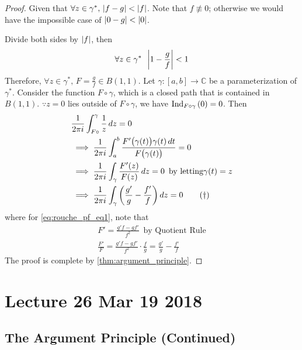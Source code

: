 \documentclass[notoc,notitlepage]{tufte-book}
\begin{document}
\begin{proof}
  Given that $\forall z \in \gamma^*, \, \abs{f - g} < \abs{f}$. Note that $f \not\equiv 0$; otherwise we would have the impossible case of $\abs{0 - g} < \abs{0}$.

  Divide both sides by $\abs{f}$, then
  \begin{equation*}
    \forall z \in \gamma^* \enspace \abs{1 - \frac{g}{f} } < 1
  \end{equation*}
  Therefore, $\forall z \in \gamma^*, \, F = \frac{g}{f} \in B(1, 1)$. Let $\gamma : [a, b] \to \mathbb{C}$ be a parameterization of $\gamma^*$. Consider the function $F \circ \gamma$, which is a closed path that is contained in $B(1, 1)$. $\because z = 0$ lies outside of $F \circ \gamma$, we have $\ind{0}{F \circ \gamma} = 0$. Then
  \begin{align}
    &\frac{1}{2 \pi i} \int_{F \circ}^{\gamma} \frac{1}{z} \dif{z} = 0 \nonumber \\
    &\implies \frac{1}{2 \pi i} \int_{a}^{b} \frac{F'\big(\gamma(t)\big) \gamma(t) \dif{t}}{F\big(\gamma(t)\big)} = 0 \nonumber \\
    &\implies \frac{1}{2 \pi i} \int_{\gamma} \frac{F'(z)}{F(z)} \dif{z} = 0 \enspace \text{by letting} \gamma(t) = z \nonumber \\
    &\implies \frac{1}{2 \pi i} \int_{\gamma} \left(\frac{g'}{g} - \frac{f'}{f} \right) \dif{z} = 0 \tag{$\dagger$}\label{eq:rouche_pf_eq1}
  \end{align}
  where for \cref{eq:rouche_pf_eq1}, note that
  \begin{gather*}
    F' = \frac{g'f - gf'}{f^2} \enspace \text{by Quotient Rule} \\
    \frac{F'}{F} = \frac{g'f - gf'}{f^2} \cdot \frac{f}{g} = \frac{g'}{g} - \frac{f'}{f} 
  \end{gather*}
  The proof is complete by \cref{thm:argument_principle}.
\end{proof}



\chapter{Lecture 26 Mar 19 2018}
  \label{chapter:lecture_26_mar_19_2018}

\section{The Argument Principle (Continued)} %
\label{sec:the_argument_principle_continued}
\end{document}
